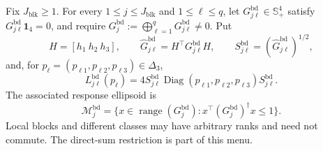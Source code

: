 Fix \(J_{\mathrm{blk}}\ge1\).  For every \(1\le j\le J_{\mathrm{blk}}\) and \(1\le\ell\le q\), let \(G^{\mathrm{bd}}_{j\ell}\in\mathbb S_+^4\) satisfy \(G^{\mathrm{bd}}_{j\ell}\mathbf 1_4=0\), and require \(G_j^{\mathrm{bd}}:=\bigoplus_{\ell=1}^qG^{\mathrm{bd}}_{j\ell}\ne0\).  Put
\[
H=[h_1\ h_2\ h_3],\qquad
\widehat G^{\mathrm{bd}}_{j\ell}=H^\top G^{\mathrm{bd}}_{j\ell}H,
\qquad
S^{\mathrm{bd}}_{j\ell}=(\widehat G^{\mathrm{bd}}_{j\ell})^{1/2},
\]
and, for \(p_\ell=(p_{\ell1},p_{\ell2},p_{\ell3})\in\Delta_3\),
\[
L^{\mathrm{bd}}_{j\ell}(p_\ell)
=4S^{\mathrm{bd}}_{j\ell}\operatorname{Diag}(p_{\ell1},p_{\ell2},p_{\ell3})S^{\mathrm{bd}}_{j\ell}.
\]
The associated response ellipsoid is
\[
\mathcal M_j^{\mathrm{bd}}
=\{x\in\operatorname{range}(G_j^{\mathrm{bd}}):
x^\top(G_j^{\mathrm{bd}})^\dagger x\le1\}.
\]
Local blocks and different classes may have arbitrary ranks and need not commute.  The direct-sum restriction is part of this menu.